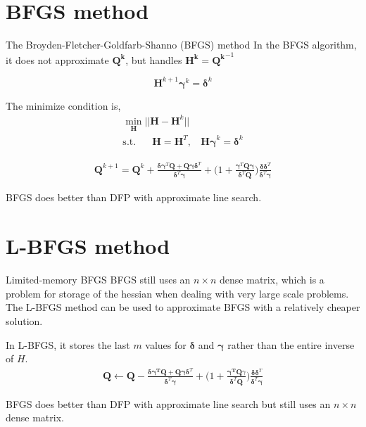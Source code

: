 \documentclass{beamer}
\begin{document}
\section{BFGS method}
\begin{frame}{The Broyden-Fletcher-Goldfarb-Shanno (BFGS) method}
In the BFGS algorithm, it does not approximate $\boldsymbol{Q^k}$, but handles $\boldsymbol{H^k} = \boldsymbol{Q^k}^{-1}$

\begin{equation*}
    \boldsymbol{H}^{k+1}\boldsymbol{\gamma}^{k} = \boldsymbol{\delta}^{k}    
\end{equation*}

The minimize condition is,
\begin{gather*}
    \underset{\boldsymbol{H}}{\min} ||\boldsymbol{H} - \boldsymbol{H}^{k}|| \\
    \textrm{s.t.~~~~~} \boldsymbol{H} = \boldsymbol{H}^T,~~~~    \boldsymbol{H \gamma}^k = \boldsymbol{\delta}^k
\end{gather*}

\begin{gather*}
    \boldsymbol{Q}^{k+1} = \boldsymbol{Q}^k + 
    \frac{\boldsymbol{\delta}\boldsymbol{\gamma}^T \boldsymbol{Q} + \boldsymbol{Q\gamma \delta}^T}
    {\boldsymbol{\delta}^T \boldsymbol{\gamma}} 
    + \bigg(1 + \frac{\boldsymbol{\gamma}^T \boldsymbol{Q \gamma}}{\boldsymbol{\delta}^T \boldsymbol{Q}}    \bigg)
    \frac{\boldsymbol{\delta}\boldsymbol{\delta}^T}{\boldsymbol{\delta}^T \boldsymbol{\gamma}}
\end{gather*}

BFGS does better than DFP with approximate line search. 

\end{frame}

\section{L-BFGS method}
\begin{frame}{Limited-memory BFGS}
BFGS still uses an $n \times n$ dense matrix, which is a problem for storage of the hessian when dealing with very large scale problems.
The L-BFGS method can be used to approximate BFGS with a relatively cheaper solution.

In L-BFGS, it stores the last $m$ values for $\boldsymbol{\delta}$ and $\boldsymbol{\gamma}$ rather than the entire inverse of $H$.
\begin{gather*}
    \boldsymbol{Q} \leftarrow \boldsymbol{Q} - 
    \frac{\boldsymbol{\delta}\boldsymbol{\gamma^T} \boldsymbol{Q} + \boldsymbol{Q\gamma \delta}^T}
    {\boldsymbol{\delta}^T \boldsymbol{\gamma}} 
    + \bigg(1 + \frac{\boldsymbol{\gamma^T} \boldsymbol{Q} \gamma}{\boldsymbol{\delta}^T \boldsymbol{Q}}    \bigg)
    \frac{\boldsymbol{\delta}\boldsymbol{\delta}^T}{\boldsymbol{\delta}^T \boldsymbol{\gamma}}
\end{gather*}

BFGS does better than DFP with approximate line search but still uses an $n \times n$ dense matrix. 

\end{frame}
\end{document}
